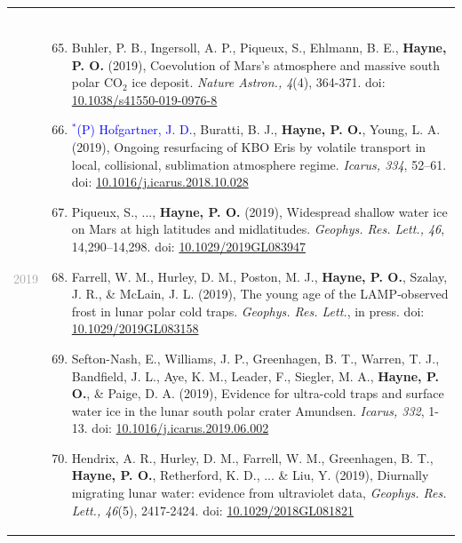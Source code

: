 \documentclass[letterpaper,10pt,twoside]{article}
\begin{document}
\begin{longtable}{@{} p{} p{}}
\begin{enumerate}[leftmargin=!,labelindent=2.5pt,itemindent=-10pt]
{             }
        \end{enumerate}\\     
        \noindent\textcolor{darkgray}{2019} & \begin{enumerate}[leftmargin=!,labelindent=2.5pt,itemindent=-10pt]\setcounter{enumi}{64}
             \item{\small Buhler, P. B., Ingersoll, A. P., Piqueux, S., Ehlmann, B. E., \textbf{Hayne, P. O.} (2019), Coevolution of Mars's atmosphere and massive south polar CO$_2$ ice deposit. \textit{Nature Astron., 4}(4), 364-371. doi: \href{https://doi.org/10.1038/s41550-019-0976-8}{10.1038/s41550-019-0976-8}
             }
             \item{\small \textcolor{blue}{$^*$(P) Hofgartner, J. D.}, Buratti, B. J., \textbf{Hayne, P. O.}, Young, L. A. (2019), Ongoing resurfacing of KBO Eris by volatile transport in local, collisional, sublimation atmosphere regime. {\it Icarus, 334}, 52--61. doi: \href{https://doi.org/10.1016/j.icarus.2018.10.028}{10.1016/j.icarus.2018.10.028}
             }
             \item{\small Piqueux, S., ..., \textbf{Hayne, P. O.} (2019), Widespread shallow water ice on Mars at high latitudes and midlatitudes. {\it Geophys. Res. Lett., 46}, 14,290--14,298. doi: \href{https://doi.org/10.1029/2019GL083947}{10.1029/2019GL083947}}
             \item{\small Farrell, W. M., Hurley, D. M., Poston, M. J., \textbf{Hayne, P. O.}, Szalay, J. R., \& McLain, J. L. (2019), The young age of the LAMP‐observed frost in lunar polar cold traps. {\it Geophys. Res. Lett.}, in press. doi: \href{https://doi.org/10.1029/2019GL083158}{10.1029/2019GL083158}
             }
             \item{\small Sefton-Nash, E., Williams, J. P., Greenhagen, B. T., Warren, T. J., Bandfield, J. L., Aye, K. M., Leader, F., Siegler, M. A., \textbf{Hayne, P. O.}, \& Paige, D. A. (2019), Evidence for ultra-cold traps and surface water ice in the lunar south polar crater Amundsen. {\it Icarus, 332}, 1-13. doi: \href{https://doi.org/10.1016/j.icarus.2019.06.002}{10.1016/j.icarus.2019.06.002}
             }
             \item{\small Hendrix, A. R., Hurley, D. M., Farrell, W. M., Greenhagen, B. T., \textbf{Hayne, P. O.}, Retherford, K. D., ... \& Liu, Y. (2019), Diurnally migrating lunar water: evidence from ultraviolet data, {\it Geophys. Res. Lett., 46}(5), 2417-2424. doi: \href{https://doi.org/10.1029/2018GL081821}{10.1029/2018GL081821}
             }

\end{enumerate}
\end{longtable}
\end{document}
